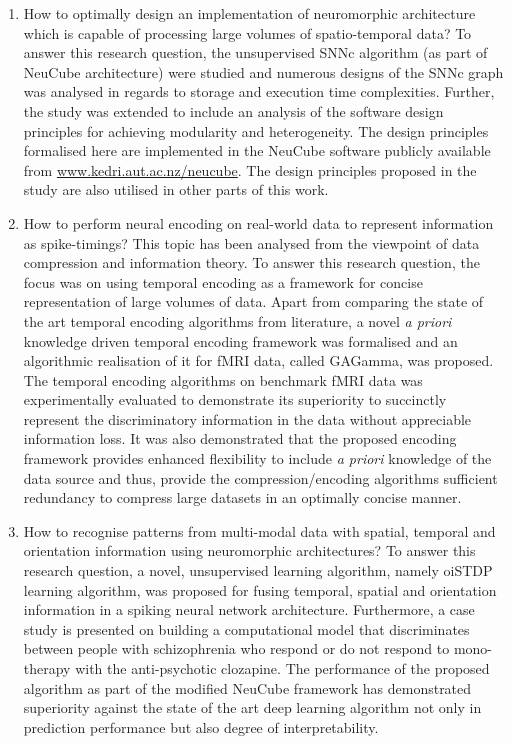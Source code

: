 \begin{enumerate}
	\item How to optimally design an implementation of neuromorphic architecture which is capable of processing large volumes of spatio-temporal data? To answer this research question, the unsupervised SNNc algorithm (as part of NeuCube architecture) were studied and numerous designs of the SNNc graph was analysed in regards to storage and execution time complexities. Further, the study was extended to include an analysis of the software design principles for achieving modularity and heterogeneity. The design principles formalised here are implemented in the NeuCube software publicly available from \url{www.kedri.aut.ac.nz/neucube}. The design principles proposed in the study are also utilised in other parts of this work.
	
	\item How to perform neural encoding on real-world data to represent information as spike-timings? This topic has been analysed from the viewpoint of data compression and information theory. To answer this research question, the focus was on using temporal encoding as a framework for concise representation of large volumes of data. Apart from comparing the state of the art temporal encoding algorithms from literature, a novel \emph{a priori} knowledge driven temporal encoding framework was formalised and an algorithmic realisation of it for fMRI data, called GAGamma, was proposed. The temporal encoding algorithms on benchmark fMRI data was experimentally evaluated to demonstrate its superiority to succinctly represent the discriminatory information in the data without appreciable information loss. It was also demonstrated that the proposed encoding framework provides enhanced flexibility to include \emph{a priori} knowledge of the data source and thus, provide the compression/encoding algorithms sufficient redundancy to compress large datasets in an optimally concise manner.
	
	\item How to recognise patterns from multi-modal data with spatial, temporal and orientation information using neuromorphic architectures? To answer this research question, a novel, unsupervised learning algorithm, namely oiSTDP learning algorithm, was proposed for fusing temporal, spatial and orientation information in a spiking neural network architecture. Furthermore, a case study is presented on building a computational model that discriminates between people with schizophrenia who respond or do not respond to mono-therapy with the anti-psychotic clozapine. The performance of the proposed algorithm as part of the modified NeuCube framework has demonstrated superiority against the state of the art deep learning algorithm not only in prediction performance but also degree of interpretability.

\end{enumerate}

